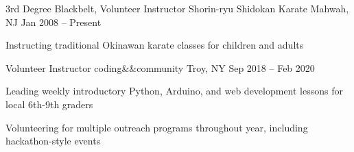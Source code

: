 


\begin{cventries}

  \cventry
  {3rd Degree Blackbelt, Volunteer Instructor}
  {Shorin-ryu Shidokan Karate}
  {Mahwah, NJ}
  {Jan 2008 -- Present}
  {
    \begin{cvitems}
      \item {Instructing traditional Okinawan karate classes for children and adults}
    \end{cvitems}
  }


  \cventry
  {Volunteer Instructor}
  {coding\&\&community}
  {Troy, NY}
  {Sep 2018 -- Feb 2020}
  {
    \begin{cvitems}
      \item {Leading weekly introductory Python, Arduino, and web development lessons for local 6th-9th graders}
      \item {Volunteering for multiple outreach programs throughout year, including hackathon-style events}
    \end{cvitems}
  }



\end{cventries}
